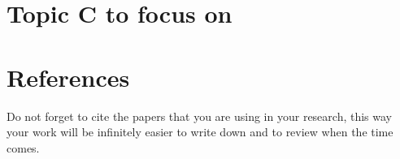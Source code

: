 \documentclass{project-logbook}
\begin{document}


\section{Topic C to focus on} \label{sec:topic_c}





\appendix

\section{References}
	\begin{HighlightedNote}{}
		Do not forget to cite the papers that you are using in your research, this way your work will be infinitely easier to write down and to review when the time comes.
	\end{HighlightedNote}

	\printbibliography[heading=none]
\end{document}
